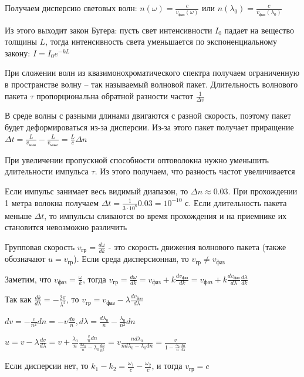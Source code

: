 Получаем дисперсию световых волн: $n(\omega) = \frac{c}{v_{\text{фаз}}(\omega)}$ или $n(\lambda_0) = \frac{c}{v_{\text{фаз}}(\lambda_0)}$

Из этого выходит закон Бугера: пусть свет интенсивности $I_0$ падает на вещество толщины $L$, тогда интенсивность света уменьшается по экспоненциальному закону: $I = I_0 e^{- k L}$

При сложении волн из квазимонохроматического спектра получаем ограниченную в пространстве волну -- так называемый волновой пакет. Длительность волнового пакета $\tau$ пропорциональна обратной разности частот $\frac{1}{\Delta v}$

В среде волны с разными длинами двигаются с разной скорость, поэтому пакет будет деформироваться из-за дисперсии. Из-за этого пакет получает приращение $\Delta t = \frac{L}{v_{\text{мин}}} - \frac{L}{v_{\text{макс}}} = \frac{L}{c} \Delta n$

При увеличении пропускной способности оптоволокна нужно уменьшить длительности импульса $\tau$. Из этого получаем, что разность частот увеличивается

Если импульс занимает весь видимый диапазон, то $\Delta n \approx 0.03$. При прохождении 1 метра волокна получаем $\Delta t = \frac{1}{3 \cdot 10^8} 0.03 = 10^{-10}$ с. Если длительность пакета меньше $\Delta t$, то импульсы сливаются во время прохождения и на приемнике их становится невозможно различить 

Групповая скорость $v_{\text{гр}} = \frac{d\omega}{dk}$ - это скорость движения волнового пакета (также обозначают $u = v_\text{гр}$). Если среда дисперсионная, то $v_{\text{гр}} \neq v_{\text{фаз}}$

Заметим, что $v_{\text{фаз}} = \frac{\omega}{k}$, тогда $v_{\text{гр}} = \frac{d\omega}{dk} = v_{\text{фаз}} + k \frac{d v_{\text{фаз}}}{dk} = v_{\text{фаз}} + k \frac{d v_{\text{фаз}}}{d\lambda} \frac{d\lambda}{dk}$

Так как $\frac{dk}{d\lambda} = -\frac{2\pi}{\lambda^2}$, то $v_{\text{гр}} = v_{\text{фаз}} - \lambda \frac{d v_{\text{фаз}}}{d\lambda}$

$dv = - \frac{c}{n^2} dn = -v \frac{dn}{n}, d\lambda = \frac{d \lambda_0}{n} - \frac{\lambda_0}{n^2} dn$

$u = v - \lambda \frac{dv}{d\lambda} = v + \frac{\lambda_0}{n} \frac{\frac{v}{n} dn}{\frac{d \lambda_0}{n} - \lambda_0 \frac{dn}{n^2}} = v \frac{n d\lambda_0}{n d\lambda_0 - \lambda_0 dn} = \frac{v}{1 - \frac{\lambda_0}{n} \frac{dn}{d\lambda}}$

Если дисперсии нет, то $k_1 - k_2 = \frac{\omega_1}{c} - \frac{\omega_2}{c}$, и тогда $v_{\text{гр}} = c$

